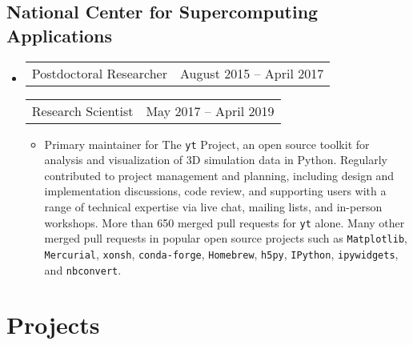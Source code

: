 \documentclass[10pt,letterpaper]{article}
\newcommand{\textline}[2]{
  \begin{tabularx}{\textwidth}{XY}
  #1 & #2
  \end{tabularx}
}
\begin{document}
\subsection*{National Center for Supercomputing Applications}
\begin{itemize}
  \item[] \textline{Postdoctoral Researcher}{August 2015 -- April 2017}  \textline{Research
    Scientist}{May 2017 -- April 2019} %
  \begin{itemize}
    \item [] Primary maintainer for The \texttt{yt} Project, an open source toolkit
      for analysis and visualization of 3D simulation data in Python. Regularly
      contributed to project management and planning, including design and
      implementation discussions, code review, and supporting users with a range
      of technical expertise via live chat, mailing lists, and in-person
      workshops. More than 650 merged pull requests for \texttt{yt} alone. Many
      other merged pull requests in popular open source projects such as
      \texttt{Matplotlib}, \texttt{Mercurial}, \texttt{xonsh},
      \texttt{conda-forge}, \texttt{Homebrew}, \texttt{h5py}, \texttt{IPython},
      \texttt{ipywidgets}, and \texttt{nbconvert}.
  \end{itemize}

\end{itemize}

\section*{Projects}
\end{document}
